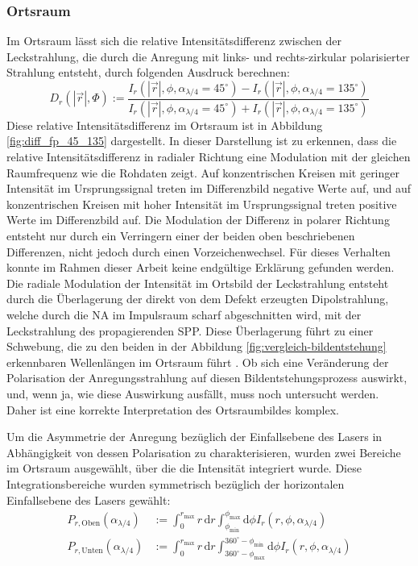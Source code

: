 \documentclass[a4paper, titlepage,  ngerman]{book}
\begin{document}
		\subsubsection{Ortsraum}
		Im Ortsraum lässt sich die relative Intensitätsdifferenz zwischen der Leckstrahlung, die durch die Anregung mit links- und rechts-zirkular polarisierter Strahlung entsteht, durch folgenden Ausdruck berechnen:
		\begin{equation}
		 	\label{eq:diff_measure}
			D_r\left(|\vec{r}|, \Phi\right) := \dfrac{I_r(|\vec{r}|, \phi, \alpha_{\lambda /4} = 45^\circ) - I_r(|\vec{r}|, \phi, \alpha_{\lambda /4} = 135^\circ)}{I_r(|\vec{r}|, \phi, \alpha_{\lambda /4} = 45^\circ) + I_r(|\vec{r}|, \phi, \alpha_{\lambda /4} = 135^\circ)}
		\end{equation} 
		 Diese relative Intensitätsdifferenz im Ortsraum ist in Abbildung \ref{fig:diff_fp_45_135} dargestellt. In dieser Darstellung ist zu erkennen, dass die relative Intensitätsdifferenz in radialer Richtung eine Modulation mit der gleichen Raumfrequenz wie die Rohdaten zeigt. Auf konzentrischen Kreisen mit geringer Intensität im Ursprungssignal treten im Differenzbild negative Werte auf, und auf konzentrischen Kreisen mit hoher Intensität im Ursprungssignal treten positive Werte im Differenzbild auf. Die Modulation der Differenz in polarer Richtung entsteht nur durch ein Verringern einer der beiden oben beschriebenen Differenzen, nicht jedoch durch einen Vorzeichenwechsel. Für dieses Verhalten konnte im Rahmen dieser Arbeit keine endgültige Erklärung gefunden werden. Die radiale Modulation der Intensität im Ortsbild der Leckstrahlung entsteht durch die Überlagerung der direkt von dem Defekt erzeugten Dipolstrahlung, welche durch die NA im Impulsraum scharf abgeschnitten wird, mit der Leckstrahlung des propagierenden SPP. Diese Überlagerung führt zu einer Schwebung, die zu den beiden in der Abbildung \ref{fig:vergleich-bildentstehung} erkennbaren Wellenlängen im Ortsraum führt \cite{Hohenau.2011}. Ob sich eine Veränderung der Polarisation der Anregungsstrahlung auf diesen Bildentstehungsprozess auswirkt, und, wenn ja, wie diese Auswirkung ausfällt, muss noch untersucht werden. Daher ist eine korrekte Interpretation des Ortsraumbildes komplex. 
		 
		 Um die Asymmetrie der Anregung bezüglich der Einfallsebene des Lasers in Abhängigkeit von dessen Polarisation zu charakterisieren, wurden zwei Bereiche im Ortsraum ausgewählt, über die die Intensität integriert wurde. Diese Integrationsbereiche wurden symmetrisch bezüglich der horizontalen Einfallsebene des Lasers gewählt:		 
		 \begin{align}
		 	P_{r, \mathrm{Oben}}(\alpha_{\lambda/4}) &:= \int_{0}^{r_\mathrm{max}}r \, \mathrm{d}r \int_{\phi_\mathrm{min}}^{\phi_\mathrm{max}} \mathrm{d}\phi I_r(r, \phi, \alpha_{\lambda /4}) \\
		 	\nonumber
		 	P_{r, \mathrm{Unten}}(\alpha_{\lambda/4}) &:= \int_{0}^{r_\mathrm{max}}r \, \mathrm{d}r \int_{360^\circ -\phi_\mathrm{max}}^{360^\circ - \phi_\mathrm{min}} \mathrm{d}\phi I_r(r, \phi, \alpha_{\lambda/4})		 	
		 \end{align}
	 
\end{document}
